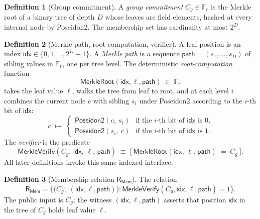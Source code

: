 \documentclass[11pt,a4paper]{article}
\theoremstyle{plain}
\theoremstyle{definition}
\newtheorem{definition}{Definition}
\newcommand{\Fr}{\mathbb{F}_r}
\newcommand{\Cg}{C_g}
\newcommand{\RMem}{\mathsf{R}_{\mathsf{Mem}}}
\newcommand{\Poseidon}{\mathsf{Poseidon2}}
\newcommand{\MerkleVerify}{\mathsf{MerkleVerify}}
\newcommand{\MerkleRoot}{\mathsf{MerkleRoot}}
\newcommand{\Idx}{\mathsf{idx}}
\newcommand{\Pth}{\mathsf{path}}
\begin{document}
\begin{definition}[Group commitment]
A \emph{group commitment} $\Cg \in \Fr$ is the Merkle root of a
binary tree of depth $D$ whose leaves are field elements, hashed
at every internal node by Poseidon2. The membership set has
cardinality at most $2^{D}$.
\end{definition}

\begin{definition}[Merkle path, root computation, verifier]
\label{def:merkle-interface}
A leaf position is an index $\Idx \in \{0, 1, \ldots, 2^{D} - 1\}$.
A \emph{Merkle path} is a sequence $\Pth = (s_1, \ldots, s_{D})$
of sibling values in $\Fr$, one per tree level. The
deterministic \emph{root-computation} function
\[
   \MerkleRoot(\Idx, \ell, \Pth)\;\in\;\Fr
\]
takes the leaf value $\ell$, walks the tree from leaf to root,
and at each level $i$ combines the current node $c$ with sibling
$s_i$ under Poseidon2 according to the $i$-th bit of $\Idx$:
\[
   c \;\mapsto\;
   \begin{cases}
     \Poseidon(c,\ s_i) & \text{if the $i$-th bit of $\Idx$ is $0$,} \\
     \Poseidon(s_i,\ c) & \text{if the $i$-th bit of $\Idx$ is $1$.}
   \end{cases}
\]
The \emph{verifier} is the predicate
\[
   \MerkleVerify(\Cg,\, \Idx,\, \ell,\, \Pth)
   \;\equiv\;
   \bigl[\ \MerkleRoot(\Idx,\, \ell,\, \Pth) \;=\; \Cg\ \bigr].
\]
All later definitions invoke this same indexed interface.
\end{definition}

\begin{definition}[Membership relation $\RMem$]
\label{def:rmem}
The relation
\[
\RMem
= \bigl\{\bigl(\Cg;\; (\Idx, \ell, \Pth)\bigr)
       : \MerkleVerify(\Cg, \Idx, \ell, \Pth) = 1 \bigr\}.
\]
The public input is $\Cg$; the witness $(\Idx, \ell, \Pth)$
asserts that position $\Idx$ in the tree of $\Cg$ holds leaf
value $\ell$.
\end{definition}
\end{document}
